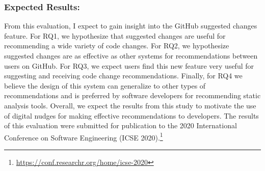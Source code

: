 \subsubsection{Expected Results:} From this evaluation, I expect to gain insight into the GitHub suggested changes feature. For RQ1, we hypothesize that suggested changes are useful for recommending a wide variety of code changes. For RQ2, we hypothesize suggested changes are as effective as other systems for recommendations between users on GitHub. For RQ3, we expect users find this new feature very useful for suggesting and receiving code change recommendations. Finally, for RQ4 we believe the design of this system can generalize to other types of recommendations and is preferred by software developers for recommending static analysis tools. Overall, we expect the results from this study to motivate the use of digital nudges for making effective recommendations to developers. The results of this evaluation were submitted for publication to the 2020 International Conference on Software Engineering (ICSE 2020).\footnote{\url{https://conf.researchr.org/home/icse-2020}}




